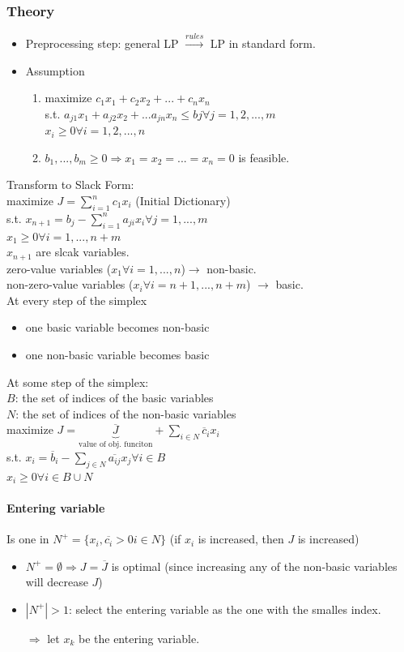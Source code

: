 \subsubsection{Theory}
\begin{itemize}
	\item Preprocessing step: general LP $\stackrel{rules}{\rightarrow}$ LP in standard form. 
	\item Assumption
	\begin{enumerate}
		\item maximize $c_1x_1+c_2x_2+...+c_nx_n$ \\
		s.t. $a_{j1}x_1+a_{j2}x_2+...a_{jn}x_n \leq bj \forall j=1,2,...,m$ \\
		$x_i \geq 0 \forall i = 1,2,...,n$
		\item $b_1,...,b_m \geq 0 \Rightarrow x_1=x_2=...=x_n=0$ is feasible.
	\end{enumerate} 
\end{itemize}
Transform to Slack Form: \\
maximize $J = \sum_{i=1}^nc_1x_i$ (Initial Dictionary)\\
s.t. $x_{n+1} = b_j - \sum_{i=1}^na_{ji}x_i \forall j = 1,...,m$ \\
$x_1 \geq 0 \forall i = 1,...,n+m$ \\
$x_{n+1}$ are slcak variables. \\
zero-value variables ($x_1 \forall i = 1,...,n$)$\rightarrow$ non-basic.\\
non-zero-value variables ($x_i \forall i = n+1,...,n+m$) $\rightarrow$ basic. \\
At every step of the simplex
\begin{itemize}
	\item one basic variable becomes non-basic
	\item one non-basic variable becomes basic
\end{itemize}
At some step of the simplex: \\
$B$: the set of indices of the basic variables \\
$N$: the set of indices of the non-basic variables \\
maximize $J = \underbrace{\overline{J}}_{\text{value of obj. funciton}} + \sum_{i \in N}\overline{c}_ix_i$ \\
s.t. $x_i = \overline{b}_i - \sum_{j \in N}\overline{a_{ij}}x_j \forall i \in B$ \\
$x_i \geq 0 \forall i \in B \cup N$ 
\paragraph{Entering variable}  Is one in $N^+ = \{x_i, \overline{c_i}>0 i \in N\}$ (if $x_i$ is increased, then $J$ is increased)
\begin{itemize}
	\item $N^+ = \emptyset \Rightarrow J = \overline{J}$ is optimal (since increasing any of the non-basic variables will decrease $J$)
	\item $|N^+| > 1$: select the entering variable as the one with the smalles index. 
	\item[$\Rightarrow$] let $x_k$ be the entering variable.
\end{itemize}
